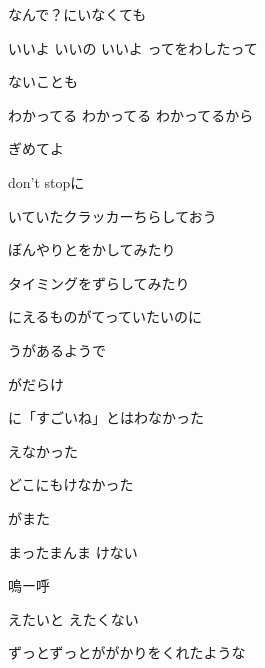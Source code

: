 \documentclass[a4paper,tate,twocolumn,12pt]{ltjtarticle}
\begin{document}
\begin{flushleft}
\vspace{2em}

\noindent\begin{minipage}{\linewidth}
なんで？にいなくても

いいよ いいの いいよ ってをわしたって

ないことも

わかってる わかってる わかってるから

ぎめてよ

don't stopに

いていたクラッカーちらしておう
\end{minipage}

\vspace{2em}

\noindent\begin{minipage}{\linewidth}
ぼんやりとをかしてみたり

タイミングをずらしてみたり

にえるものがてっていたいのに
\end{minipage}

\vspace{2em}

\noindent\begin{minipage}{\linewidth}
うがあるようで

がだらけ

に「すごいね」とはわなかった

えなかった

どこにもけなかった

がまた

まったまんま けない

嗚ー呼
\end{minipage}

\vspace{2em}

\noindent\begin{minipage}{\linewidth}
えたいと えたくない

ずっとずっとががかりをくれたような


\end{minipage}
\end{flushleft}
\end{document}
